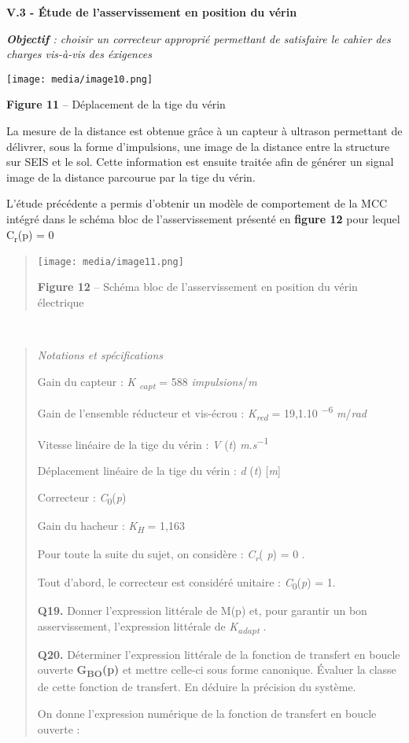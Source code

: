 \documentclass[]{article}
\begin{document}
\textbf{V.3 - Étude de l'asservissement en position du vérin}

\emph{\textbf{Objectif} : choisir un correcteur approprié permettant de
satisfaire le cahier des charges vis-à-vis des éxigences}

\texttt{[image: media/image10.png]}

\textbf{Figure 11} -- Déplacement de la tige du vérin

La mesure de la distance est obtenue grâce à un capteur à ultrason
permettant de délivrer, sous la forme d'impulsions, une image de la
distance entre la structure sur SEIS et le sol. Cette information est
ensuite traitée afin de générer un signal image de la distance parcourue
par la tige du vérin.

\protect\hypertarget{page11}{}{}L'étude précédente a permis d'obtenir un
modèle de comportement de la MCC intégré dans le schéma bloc de
l'asservissement présenté en \textbf{figure 12} pour lequel
C\textsubscript{r}(p) = 0

\begin{quote}
\texttt{[image: media/image11.png]}

\textbf{Figure 12} -- Schéma bloc de l'asservissement en position du
vérin électrique
\end{quote}

\emph{\\
}

\begin{quote}
\emph{Notations et spécifications}

Gain du capteur : \emph{K} \emph{\textsubscript{capt}} = 588
\emph{impulsions}/\emph{m}

Gain de l'ensemble réducteur et vis-écrou : \emph{K\textsubscript{red}}
= 19,1.10 \textsuperscript{−6} \emph{m}/\emph{rad}

Vitesse linéaire de la tige du vérin : \emph{V} (\emph{t})
\emph{m}.\emph{s}\textsuperscript{−1}

Déplacement linéaire de la tige du vérin : \emph{d} (\emph{t})
{[}\emph{m}{]}

Correcteur : \emph{C}\textsubscript{0}(\emph{p})

Gain du hacheur : \emph{K\textsubscript{H}} = 1,163

Pour toute la suite du sujet, on considère : \emph{C\textsubscript{r}}(
\emph{p}) = 0 .

Tout d'abord, le correcteur est considéré unitaire :
\emph{C}\textsubscript{0}(\emph{p}) = 1.

\textbf{Q19.} Donner l'expression littérale de M(p) et, pour garantir un
bon asservissement, l'expression littérale de
\emph{K\textsubscript{adapt}} .

\textbf{Q20.} Déterminer l'expression littérale de la fonction de
transfert en boucle ouverte \textbf{G\textsubscript{BO}(p)} et mettre
celle-ci sous forme canonique. Évaluer la classe de cette fonction de
transfert. En déduire la précision du système.

On donne l'expression numérique de la fonction de transfert en boucle
ouverte :
\end{quote}
\end{document}
